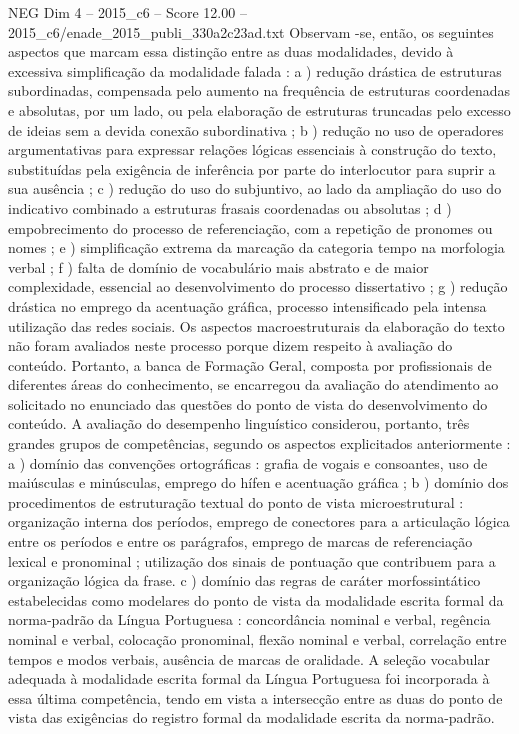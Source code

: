 \begin{textsample}{NEG Dim 4 – 2015\_c6 – Score 12.00 – 2015\_c6/enade\_2015\_publi\_330a2c23ad.txt}
Observam -se, então, os seguintes aspectos que marcam essa distinção entre as duas modalidades, devido à excessiva simplificação da modalidade falada : a ) redução drástica de estruturas subordinadas, compensada pelo aumento na frequência de estruturas coordenadas e absolutas, por um lado, ou pela elaboração de estruturas truncadas pelo excesso de ideias sem a devida conexão subordinativa ; b ) redução no uso de operadores argumentativas para expressar relações lógicas essenciais à construção do texto, substituídas pela exigência de inferência por parte do interlocutor para suprir a sua ausência ; c ) redução do uso do subjuntivo, ao lado da ampliação do uso do indicativo combinado a estruturas frasais coordenadas ou absolutas ; d ) empobrecimento do processo de referenciação, com a repetição de pronomes ou nomes ; e ) simplificação extrema da marcação da categoria tempo na morfologia verbal ; f ) falta de domínio de vocabulário mais abstrato e de maior complexidade, essencial ao desenvolvimento do processo dissertativo ; g ) redução drástica no emprego da acentuação gráfica, processo intensificado pela intensa utilização das redes sociais.
Os aspectos macroestruturais da elaboração do texto não foram avaliados neste processo porque dizem respeito à avaliação do conteúdo.
Portanto, a banca de Formação Geral, composta por profissionais de diferentes áreas do conhecimento, se encarregou da avaliação do atendimento ao solicitado no enunciado das questões do ponto de vista do desenvolvimento do conteúdo.
A avaliação do desempenho linguístico considerou, portanto, três grandes grupos de competências, segundo os aspectos explicitados anteriormente : a ) domínio das convenções ortográficas : grafia de vogais e consoantes, uso de maiúsculas e minúsculas, emprego do hífen e acentuação gráfica ; b ) domínio dos procedimentos de estruturação textual do ponto de vista microestrutural : organização interna dos períodos, emprego de conectores para a articulação lógica entre os períodos e entre os parágrafos, emprego de marcas de referenciação lexical e pronominal ; utilização dos sinais de pontuação que contribuem para a organização lógica da frase. c ) domínio das regras de caráter morfossintático estabelecidas como modelares do ponto de vista da modalidade escrita formal da norma-padrão da Língua Portuguesa : concordância nominal e verbal, regência nominal e verbal, colocação pronominal, flexão nominal e verbal, correlação entre tempos e modos verbais, ausência de marcas de oralidade.
A seleção vocabular adequada à modalidade escrita formal da Língua Portuguesa foi incorporada à essa última competência, tendo em vista a intersecção entre as duas do ponto de vista das exigências do registro formal da modalidade escrita da norma-padrão.

\end{textsample}
